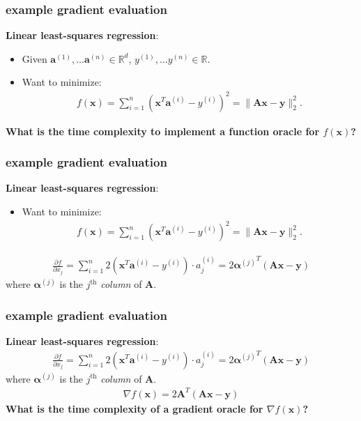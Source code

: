 \documentclass[compress]{beamer}
\newcommand{\bs}[1]{\boldsymbol{#1}}
\newcommand{\bv}[1]{\mathbf{#1}}
\newcommand{\R}{\mathbb{R}}
\begin{document}
\begin{frame}[t]
	\frametitle{example gradient evaluation}
	\textbf{Linear least-squares regression}:
	\begin{itemize}
		\item Given $\bv{a}^{(1)}, \ldots \bv{a}^{(n)} \in \R^d$, ${y}^{(1)}, \ldots {y}^{(n)} \in \R$.
		\item Want to minimize:
		\begin{align*}
			f(\bv{x}) = \sum_{i=1}^n \left(\bv{x}^T\bv{a}^{(i)} - {y}^{(i)}\right)^2 = \|\bv{A}\bv{x} - \bv{y}\|_2^2.
		\end{align*} 
	\end{itemize}
	\textbf{What is the time complexity to implement a function oracle for $f(\bv{x})$?}
\end{frame}

\begin{frame}[t]
	\frametitle{example gradient evaluation}
	\textbf{Linear least-squares regression}:
	\begin{itemize}
		\item Want to minimize:
		\begin{align*}
			f(\bv{x}) = \sum_{i=1}^n \left(\bv{x}^T\bv{a}^{(i)} - {y}^{(i)}\right)^2 = \|\bv{A}\bv{x} - \bv{y}\|_2^2.
		\end{align*} 
	\end{itemize}
	
	\begin{align*}
		\frac{\partial f}{\partial x_j} = \sum_{i=1}^n 2\left(\bv{x}^T\bv{a}^{(i)} - {y}^{(i)}\right)\cdot a^{(i)}_j = 2{\bs{\alpha}^{(j)}}^T(\bv{A}\bv{x} -\bv{y})
	\end{align*}
	where $\bs{\alpha}^{(j)}$ is the $j^\text{th}$ \emph{column} of $\bv{A}$. 
\end{frame}

\begin{frame}[t]
	\frametitle{example gradient evaluation}
	\textbf{Linear least-squares regression}:
	\begin{align*}
		\frac{\partial f}{\partial x_j} = \sum_{i=1}^n 2\left(\bv{x}^T\bv{a}^{(i)} - {y}^{(i)}\right)\cdot a^{(i)}_j = 2{\bs{\alpha}^{(j)}}^T(\bv{A}\bv{x} -\bv{y})
	\end{align*}
	where $\bs{\alpha}^{(j)}$ is the $j^\text{th}$ \emph{column} of $\bv{A}$. 
	\begin{align*}
		\nabla f(\bv{x}) = 2\bv{A}^T\left(\bv{A}\bv{x} - \bv{y}\right)
	\end{align*}
	\textbf{What is the time complexity of a gradient oracle for $\nabla f(\bv{x})$?}
\end{frame}
\end{document}
